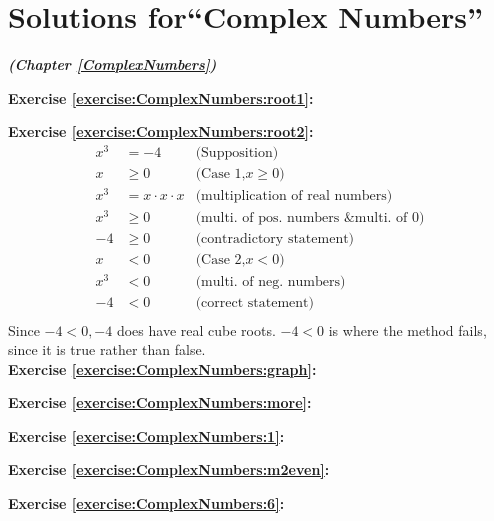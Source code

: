 \section{Solutions for``Complex Numbers''}
\noindent\textbf{\textit{ (Chapter \ref{ComplexNumbers})}}\bigskip

\noindent\textbf{Exercise \ref{exercise:ComplexNumbers:root1}:}

\noindent\textbf{Exercise \ref{exercise:ComplexNumbers:root2}:} %
\begin{align*}
x^{3} &= -4		&\text{(Supposition)}\\
x &\geq 0		&\text{(Case 1,} x \geq 0)\\
x^{3} &= x \cdot x \cdot x 		&\text{(multiplication of real numbers)}\\
x^{3} &\geq 0		&\text{(multi. of pos. numbers \& multi. of 0)}\\
-4 &\geq 0		&\text{(contradictory statement)}\\
x &< 0		&\text{(Case 2,} x < 0)\\
x^{3} &< 0		&\text{(multi. of neg. numbers)}\\
-4 &< 0		&\text{(correct statement)}\\
\end{align*}
Since $-4 < 0, -4$ does have real cube roots. $-4 < 0$ is where the method fails, since it is true rather than false.\\

\noindent\textbf{Exercise \ref{exercise:ComplexNumbers:graph}:}

\noindent\textbf{Exercise \ref{exercise:ComplexNumbers:more}:}

\noindent\textbf{Exercise \ref{exercise:ComplexNumbers:1}:}

\noindent\textbf{Exercise \ref{exercise:ComplexNumbers:m2even}:}

\noindent\textbf{Exercise \ref{exercise:ComplexNumbers:6}:}

